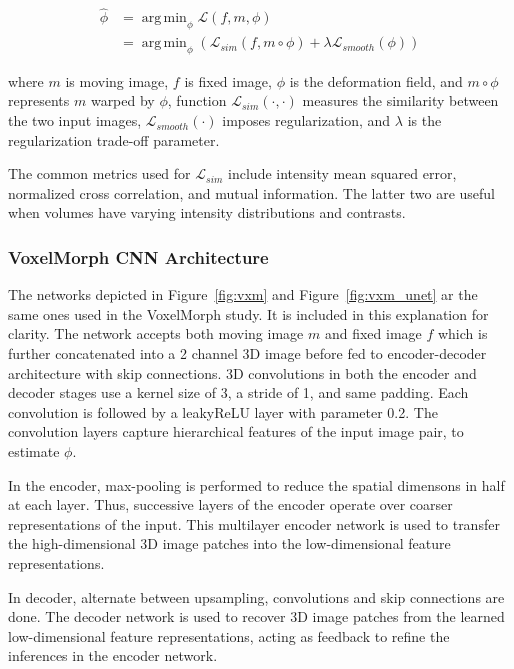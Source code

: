 \documentclass{book}
\DeclareMathOperator*{\argmin}{arg\,min}
\begin{document}
	
	\begin{equation} \label{loss_vxm}
	\begin{split}
	\hat{\phi} & = \argmin_\phi \mathcal{L}(f,m,\phi) \\
	& = \argmin_\phi (\mathcal{L}_{sim}(f,m \circ \phi) + \lambda \mathcal{L}_{smooth}(\phi))
	\end{split}
	\end{equation}
	
	where $m$ is moving image, $f$ is fixed image, $\phi$ is the deformation field, and $m \circ \phi$ represents $m$ warped by $\phi$, function $\mathcal{L}_{sim}(\cdot,\cdot)$ measures the similarity between the two input images, $\mathcal{L}_{smooth}(\cdot)$ imposes regularization, and $\lambda$ is the regularization trade-off parameter.
	
	The common metrics used for $\mathcal{L}_{sim}$ include intensity mean squared error, normalized cross correlation, and mutual information. The latter two are useful when volumes have varying intensity distributions and contrasts.
	
	\subsubsection{VoxelMorph CNN Architecture}
	
	The networks depicted in Figure~\ref{fig:vxm} and Figure~\ref{fig:vxm_unet} ar the same ones used in the VoxelMorph \cite{Balakrishnan_2019} study. It is included in this explanation for clarity. The network accepts both moving image $m$ and fixed image $f$ which is further concatenated into a 2 channel 3D image before fed to encoder-decoder architecture with skip connections. 3D convolutions in both the encoder and decoder stages use a kernel size of 3, a stride of 1, and same padding. Each convolution is followed by a leakyReLU layer with parameter 0.2. The convolution layers capture hierarchical features of the input image pair, to estimate $\phi$.
	
	In the encoder, max-pooling is performed to reduce the spatial dimensons in half at each layer. Thus, successive layers of the encoder operate over coarser representations of the input. This multilayer encoder network is used to transfer the high-dimensional 3D image patches into the low-dimensional feature representations.
	
	In decoder, alternate between upsampling, convolutions and skip connections are done. The decoder network is used to recover 3D image patches from the learned low-dimensional feature representations, acting as feedback to refine the inferences in the encoder network.
	
\end{document}

